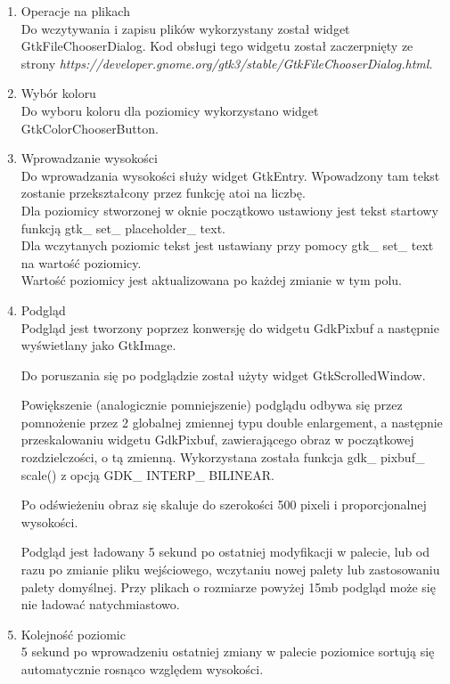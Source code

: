 \documentclass[a4paper]{article}
\begin{document}
\begin{enumerate}
\item{Operacje na plikach}\\
Do wczytywania i zapisu plików wykorzystany został widget GtkFileChooserDialog. Kod obsługi tego widgetu został zaczerpnięty ze strony \textit{https://developer.gnome.org/gtk3/stable/GtkFileChooserDialog.html}.
 
\item{Wybór koloru}\\
Do wyboru koloru dla poziomicy wykorzystano widget GtkColorChooserButton.

\item{Wprowadzanie wysokości}\\
Do wprowadzania wysokości służy widget GtkEntry. Wpowadzony tam tekst zostanie przekształcony przez funkcję atoi na liczbę. \\
Dla poziomicy stworzonej w oknie początkowo ustawiony jest tekst startowy funkcją gtk\_ set\_ placeholder\_ text.\\
Dla wczytanych poziomic tekst jest ustawiany przy pomocy gtk\_ set\_ text na wartość poziomicy.\\
Wartość poziomicy jest aktualizowana po każdej zmianie w tym polu.
 
\item{Podgląd}\\
Podgląd jest tworzony poprzez konwersję do widgetu GdkPixbuf a następnie wyświetlany jako GtkImage.

Do poruszania się po podglądzie został użyty widget GtkScrolledWindow.

Powiększenie (analogicznie pomniejszenie) podglądu odbywa się przez pomnożenie przez 2 globalnej zmiennej typu double enlargement, a następnie przeskalowaniu widgetu GdkPixbuf, zawierającego obraz w początkowej rozdzielczości, o tą zmienną. Wykorzystana została funkcja gdk\_ pixbuf\_ scale() z opcją GDK\_ INTERP\_ BILINEAR.

Po odświeżeniu obraz się skaluje do szerokości 500 pixeli i proporcjonalnej wysokości.

Podgląd jest ładowany 5 sekund po ostatniej modyfikacji w palecie, lub od razu po zmianie pliku wejściowego, wczytaniu nowej palety lub zastosowaniu palety domyślnej. Przy plikach o rozmiarze powyżej 15mb podgląd może się nie ładować natychmiastowo.

\item{Kolejność poziomic}\\
 5 sekund po wprowadzeniu ostatniej zmiany w palecie poziomice sortują się automatycznie rosnąco względem wysokości.
\end{enumerate}
\end{document}
